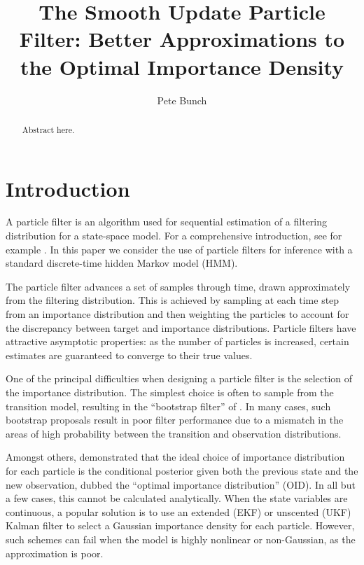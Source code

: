 \documentclass{statsoc}
\title[Smooth Update Particle Filter]{The Smooth Update Particle Filter: Better Approximations to the Optimal Importance Density}
\author[Bunch {\it et al.}]{Pete Bunch}
\begin{document}
\begin{abstract}
Abstract here.
\end{abstract}






\section{Introduction}

A particle filter is an algorithm used for sequential estimation of a filtering distribution for a state-space model. For a comprehensive introduction, see for example \citep{Cappe2007,Doucet2009}. In this paper we consider the use of particle filters for inference with a standard discrete-time hidden Markov model (HMM).

The particle filter advances a set of samples through time, drawn approximately from the filtering distribution. This is achieved by sampling at each time step from an importance distribution and then weighting the particles to account for the discrepancy between target and importance distributions. Particle filters have attractive asymptotic properties: as the number of particles is increased, certain estimates are guaranteed to converge to their true values. %

One of the principal difficulties when designing a particle filter is the selection of the importance distribution. The simplest choice is often to sample from the transition model, resulting in the ``bootstrap filter'' of \citep{Gordon1993}. In many cases, such bootstrap proposals result in poor filter performance due to a mismatch in the areas of high probability between the transition and observation distributions.

Amongst others, \citet{Doucet2000a} demonstrated that the ideal choice of importance distribution for each particle is the conditional posterior given both the previous state and the new observation, dubbed the ``optimal importance distribution'' (OID). In all but a few cases, this cannot be calculated analytically. When the state variables are continuous, a popular solution is to use an extended (EKF) or unscented (UKF) Kalman filter to select a Gaussian importance density for each particle. However, such schemes can fail when the model is highly nonlinear or non-Gaussian, as the approximation is poor.
\end{document}
